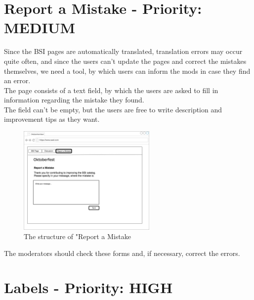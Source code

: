 \section{Report a Mistake  - Priority: MEDIUM}

Since the BSI pages are automatically translated, translation errors may occur quite often, and since the users can't update the pages and correct the mistakes themselves, we need a tool, by which users can inform the mods in case they find an error. \\
The page consists of a text field, by which the users are asked to fill in information regarding the mistake they found.\\
The field can't be empty, but the users are free to write description and improvement tips as they want.

\begin{figure}[h] 
    \centering
    \includegraphics[width=0.6\textwidth]{Pictures/report1.jpg}
    \caption{The structure of "Report a Mistake}
\end{figure} 

The moderators should check these forms and, if necessary, correct the errors.



\section{Labels - Priority: HIGH}
 
